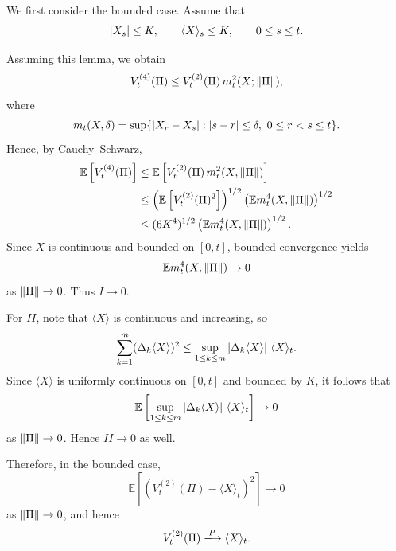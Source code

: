 {    We first consider the bounded case. Assume that
    $$
        \left| X_s \right| \leq K, \qquad \langle X \rangle_s \leq K, \qquad 0 \leq s \leq t.
    $$


    Assuming this lemma, we obtain
    $$
        V_t^{(4)}(\Pi)
        \leq
        V_t^{(2)}(\Pi)\, m_t^2(X;\left\| \Pi \right\|),
    $$
    where
    $$
        m_t(X,\delta) = \sup\{\left| X_r - X_s \right| : \left| s-r \right| \leq \delta,\ 0 \leq r < s \leq t\}.
    $$
    Hence, by Cauchy--Schwarz,
    $$
    \begin{aligned}
        \mathbb{E}\left[ V_t^{(4)}(\Pi) \right]
        &\leq \mathbb{E}\left[ V_t^{(2)}(\Pi)\,m_t^2(X,\left\| \Pi \right\|) \right] \\
        &\leq \left(\mathbb{E}\left[ V_t^{(2)}(\Pi)^2 \right]\right)^{1/2}
        \left(\mathbb{E}m_t^4(X,\left\| \Pi \right\|)\right)^{1/2} \\
        &\leq (6K^4)^{1/2}\left(\mathbb{E}m_t^4(X,\left\| \Pi \right\|)\right)^{1/2}.
    \end{aligned}
    $$
    Since $X$ is continuous and bounded on $[0,t]$, bounded convergence yields
    $$
        \mathbb{E}m_t^4(X,\left\| \Pi \right\|) \to 0
    $$
    as $\left\| \Pi \right\| \to 0$. Thus $I \to 0$.

    For $II$, note that $\langle X \rangle$ is continuous and increasing, so
    $$
        \sum_{k=1}^{m}(\Delta_k \langle X \rangle)^2
        \leq
        \sup_{1 \leq k \leq m}\left| \Delta_k \langle X \rangle \right|\,\langle X \rangle_t.
    $$
    Since $\langle X \rangle$ is uniformly continuous on $[0,t]$ and bounded by $K$, it follows that
    $$
        \mathbb{E}\left[
            \sup_{1 \leq k \leq m}\left| \Delta_k \langle X \rangle \right|\,\langle X \rangle_t
        \right] \to 0
    $$
    as $\left\| \Pi \right\| \to 0$. Hence $II \to 0$ as well.

    Therefore, in the bounded case,
    $$
        \mathbb{E}\left[
            \left( V_t^{(2)}(\Pi) - \langle X \rangle_t \right)^2
        \right] \to 0
    $$
    as $\left\| \Pi \right\| \to 0$, and hence
    $$
        V_t^{(2)}(\Pi) \xlongrightarrow{P} \langle X \rangle_t.
    $$

}

